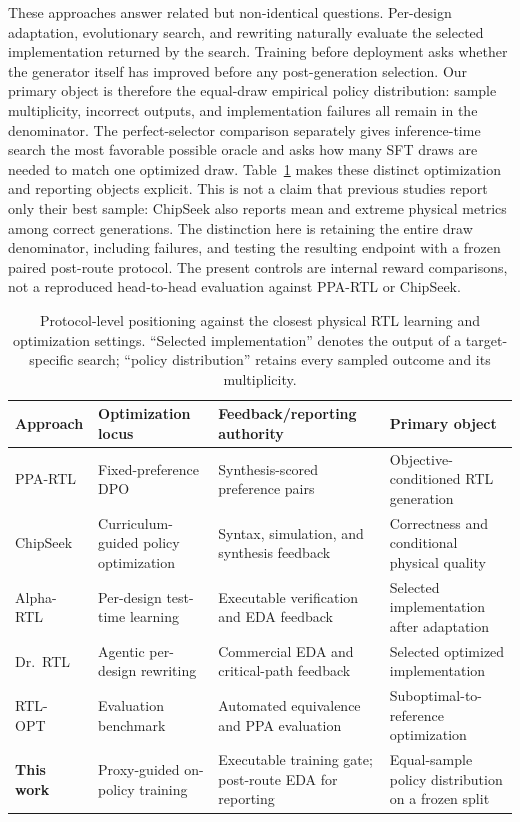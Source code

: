 These approaches answer related but non-identical questions.  Per-design
adaptation, evolutionary search, and rewriting naturally evaluate the selected
implementation returned by the search.  Training before deployment asks whether
the generator itself has improved before any post-generation selection.  Our
primary object is therefore the equal-draw empirical policy distribution:
sample multiplicity, incorrect outputs, and implementation failures all remain
in the denominator.  The perfect-selector comparison separately gives
inference-time search the most favorable possible oracle and asks how many SFT
draws are needed to match one optimized draw.  Table~\ref{tab:positioning}
makes these distinct optimization and reporting objects explicit.  This is not
a claim that previous studies report only their best sample: ChipSeek also
reports mean and extreme physical metrics among correct generations.  The
distinction here is retaining the entire draw denominator, including failures,
and testing the resulting endpoint with a frozen paired post-route protocol.
The present controls are internal reward comparisons, not a reproduced
head-to-head evaluation against PPA-RTL or ChipSeek.

\begin{table}[t]
\centering
\caption{Protocol-level positioning against the closest physical RTL learning
and optimization settings.  ``Selected implementation'' denotes the output of
a target-specific search; ``policy distribution'' retains every sampled
outcome and its multiplicity.}
\label{tab:positioning}
\small
\begin{tabularx}{\textwidth}{@{}lXXX@{}}
\toprule
Approach & Optimization locus & Feedback/reporting authority & Primary object \tabularnewline
\midrule
PPA-RTL~\cite{ppartl2025}
& Fixed-preference DPO
& Synthesis-scored preference pairs
& Objective-conditioned RTL generation \tabularnewline
ChipSeek~\cite{chipseek2025}
& Curriculum-guided policy optimization
& Syntax, simulation, and synthesis feedback
& Correctness and conditional physical quality \tabularnewline
Alpha-RTL~\cite{zhou2026alphartl}
& Per-design test-time learning
& Executable verification and EDA feedback
& Selected implementation after adaptation \tabularnewline
Dr.~RTL~\cite{drrtl2026}
& Agentic per-design rewriting
& Commercial EDA and critical-path feedback
& Selected optimized implementation \tabularnewline
RTL-OPT~\cite{lu2026rtlopt}
& Evaluation benchmark
& Automated equivalence and PPA evaluation
& Suboptimal-to-reference optimization \tabularnewline
\textbf{This work}
& Proxy-guided on-policy training
& Executable training gate; post-route EDA for reporting
& Equal-sample policy distribution on a frozen split \tabularnewline
\bottomrule
\end{tabularx}
\end{table}

